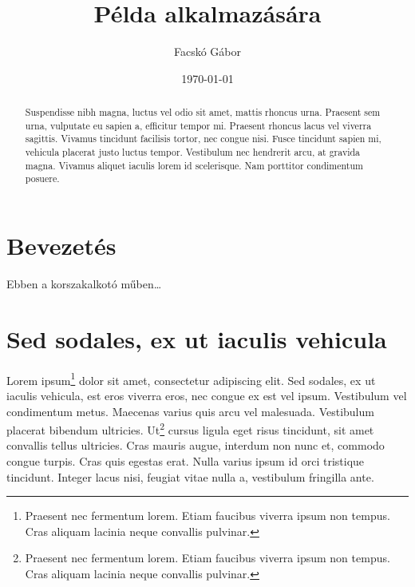 \documentclass[a4paper,12pt,draft]{report}
\begin{document}
\author{Facskó Gábor}

\title{Példa   alkalmazására}

\date{\today}

\maketitle



\begin{abstract}
Suspendisse nibh magna, luctus vel odio sit amet, mattis rhoncus urna. Praesent sem urna, vulputate eu sapien a, efficitur tempor mi. Praesent rhoncus lacus vel viverra sagittis. Vivamus tincidunt facilisis tortor, nec congue nisi. Fusce tincidunt sapien mi, vehicula placerat justo luctus tempor. Vestibulum nec hendrerit arcu, at gravida magna. Vivamus aliquet iaculis lorem id scelerisque. Nam porttitor condimentum posuere.
\end{abstract}


\tableofcontents

\chapter*{Bevezetés}

Ebben a korszakalkotó műben\dots

\chapter{Sed sodales, ex ut iaculis vehicula}
\label{cha:sed}

Lorem ipsum\footnote{Praesent nec fermentum lorem. Etiam faucibus viverra ipsum non tempus. Cras aliquam lacinia neque convallis pulvinar.} dolor sit amet, consectetur adipiscing elit. Sed sodales, ex ut iaculis vehicula, est eros viverra eros, nec congue ex est vel ipsum. Vestibulum vel condimentum metus. Maecenas varius quis arcu vel malesuada. Vestibulum placerat bibendum ultricies. Ut\footnote{Praesent nec fermentum lorem. Etiam faucibus viverra ipsum non tempus. Cras aliquam lacinia neque convallis pulvinar.} cursus ligula eget risus tincidunt, sit amet convallis tellus ultricies. Cras mauris augue, interdum non nunc et, commodo congue turpis. Cras quis egestas erat. Nulla varius ipsum id orci tristique tincidunt. Integer lacus nisi, feugiat vitae nulla a, vestibulum fringilla ante. \citep{facsko_sw2024}
\end{document}
